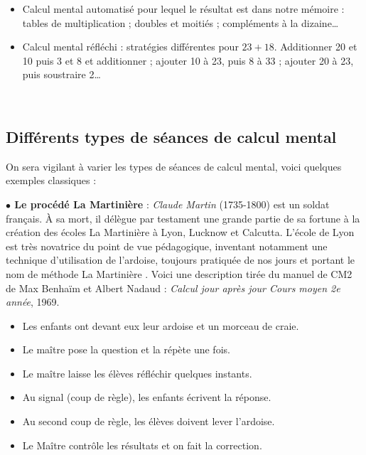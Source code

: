 \begin{exemple*1}
{\small
   \begin{itemize}
      \item Calcul mental automatisé pour lequel le résultat est dans notre mémoire : tables de multiplication ; doubles et moitiés ; compléments à la dizaine\dots
      \item Calcul mental réfléchi : stratégies différentes pour $23+18$. Additionner 20 et 10 puis 3 et 8 et additionner ; ajouter 10 à 23, puis 8 à 33 ; ajouter 20 à 23, puis soustraire 2\dots
   \end{itemize}}
   \ \\ [-10mm]
\end{exemple*1}


\subsection{Différents types de séances de calcul mental}

On sera vigilant à varier les types de séances de calcul mental, voici quelques exemples classiques : \smallskip

\textbf{$\bullet$ Le procédé La Martinière} : {\it Claude Martin} (1735-1800) est un soldat français. À sa mort, il délègue par testament une grande partie de sa fortune à la création des écoles \og La Martinière \fg{} à Lyon, Lucknow et Calcutta. L’école de Lyon est très novatrice du point de vue pédagogique, inventant notamment une technique d’utilisation de l’ardoise, toujours pratiquée de nos jours et portant le nom de méthode \og La Martinière \fg. Voici une description tirée du manuel de CM2 de Max Benhaïm et Albert Nadaud : {\it Calcul jour après jour Cours moyen 2e année}, 1969.

{\small
\begin{documentation} 
   \begin{itemize}
      \item Les enfants ont devant eux leur ardoise et un morceau de craie.
      \item Le maître pose la question et la répète une fois.
      \item Le maître laisse les élèves réfléchir quelques instants.
      \item Au signal (coup de règle), les enfants écrivent la réponse.
      \item Au second coup de règle, les élèves doivent lever l’ardoise.
      \item Le Maître contrôle les résultats et on fait la correction.
   \end{itemize}
   \ \\ [-10mm]
\end{documentation} }

